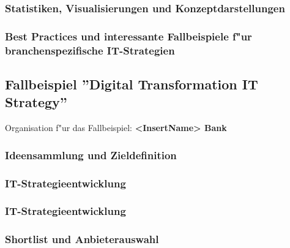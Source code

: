 \documentclass[a4paper, 12pt]{article} %
\begin{document}
\subsubsection{Statistiken, Visualisierungen und Konzeptdarstellungen}


\subsubsection{Best Practices und interessante Fallbeispiele f"ur branchenspezifische IT-Strategien}


\newpage
\subsection{Fallbeispiel ''Digital Transformation IT Strategy''}
\label{subsec:Fallbeispiel}
Organisation f"ur das Fallbeispiel: \textbf{<InsertName> Bank}

\subsubsection{Ideensammlung und Zieldefinition}


\subsubsection{IT-Strategieentwicklung}




\subsubsection{IT-Strategieentwicklung}



\subsubsection{Shortlist und Anbieterauswahl}







\end{document}
